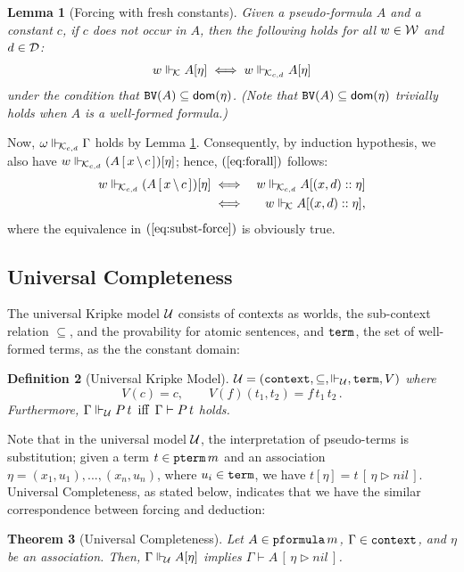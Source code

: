 \documentclass{svjour3}                     %
\newtheorem{thm}{Theorem}%
\newtheorem{lem}[thm]{Lemma}
\newtheorem{defi}[thm]{Definition}
\newcommand{\cald}{{\cal D}}
\newcommand{\calk}{{\cal K}}
\newcommand{\calu}{{\cal U}}
\newcommand{\calw}{{\cal W}}
\newcommand{\Ga}{\Gamma}
\newcommand{\om}{\omega}
\newcommand{\vd}{\vdash}
\newcommand{\Vd}{\Vdash}
\newcommand{\substa}[3]{#1\,[\,#2 \triangleright #3\,]}
\newcommand{\subst}[4]{#1\,[\,#2\, \backslash\, #3\,]_{#4}}
\newcommand{\tm}{\subseteq}
\newcommand{\dom}{\mathrm{\textsf{dom}}}
\newcommand{\tpterm}{\textup{\tt pterm}}
\newcommand{\tpfml}{\textup{\tt pformula}}
\newcommand{\tterm}{\textup{\tt term}}
\newcommand{\tcontext}{\textup{\tt context}}
\newcommand{\tPH}{\textup{\tt BV}}
\begin{document}
\begin{lem}[Forcing with fresh constants]\label{create-kripke}
  Given a pseudo-formula $A$ and a constant $c$, if $c$ does not occur in $A$, then the following holds for all $w \in \calw$ and $d \in \cald$:
  \begin{eqnarray*}
    w \Vd_{\!\calk} A [\eta] \iff w \Vd_{\!\calk_{c,d}} A [\eta]
  \end{eqnarray*}
under the condition that $\tPH (A) \tm \dom (\eta)$. (Note that $\tPH (A) \tm \dom (\eta)$ trivially holds when $A$ is a well-formed formula.)
\end{lem}

Now, $\om \Vd_{\!\calk_{c,d}} \Ga$ holds by Lemma \ref{create-kripke}. Consequently,  by induction hypothesis, we also have $w \Vd_{\!\calk_{c,d}} (\subst{A}{x}{c}{}) [\eta]$; hence, $(\ref{eq:forall})$ follows:
\begin{eqnarray}
  w \Vd_{\!\calk_{c,d}} (\subst{A}{x}{c}{}) [\eta] & \iff & w \Vd_{\!\calk_{c,d}} A [(x,d)::\eta] \label{eq:subst-force}\\
  & \iff & w \Vd_{\!\calk} A [(x,d)::\eta], \nonumber
\end{eqnarray}
where the equivalence in $(\ref{eq:subst-force})$ is obviously true.

\subsection{Universal Completeness}
The universal Kripke model $\calu$ consists of contexts as worlds, the sub-context relation $\tm$, and the provability for atomic sentences, and $\tterm$, the set of well-formed terms, as the the constant domain:

\begin{defi}[Universal Kripke Model]\label{def:universal}
$\calu = (\tcontext, \subseteq, \Vd_\calu, \tterm, V)$ where
  \[
  V(c) = c, \qquad V(f)(t_1, t_2) = f\, t_1\, t_2\, .
  \]
Furthermore, $\Ga \Vd_\calu P\, t \text{ \,iff\, } \Ga \vd P\,t$ holds.
\end{defi}

Note that in the universal model $\calu$, the interpretation of pseudo-terms is substitution; given a term $t \in\tpterm \, m$ and an association $\eta = (x_1,u_1),...,(x_n, u_n)$, where $u_i \in \tterm$, we have
$t[\eta] = \substa{t}{\eta}{nil}$. Universal Completeness, as stated below, indicates that we have the similar correspondence between forcing and deduction:

\begin{thm}[Universal Completeness]\label{universal}
  Let $A \in \tpfml\, m$, $\Ga \in \tcontext$, and $\eta$ be an association. Then, $\Ga \Vd_{\!\calu} A [\eta]$ implies $\Ga \vd  \substa{A}{\eta}{nil}$.
\end{thm}
\end{document}
